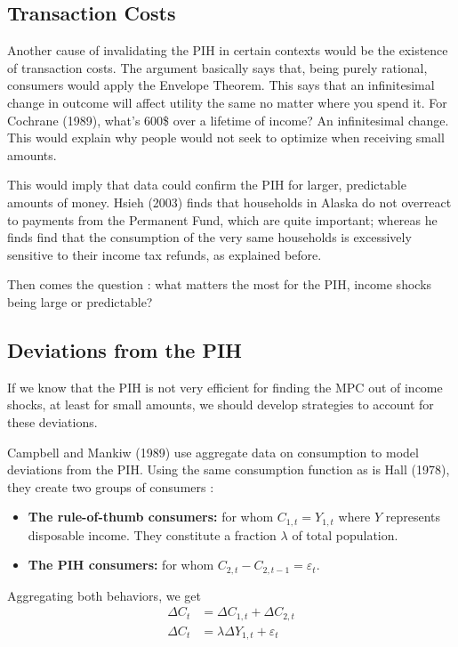 \documentclass[12pt]{report}
\begin{document}
\subsection{Transaction Costs}

Another cause of invalidating the PIH in certain contexts would be the existence of transaction costs. The argument basically says that, being purely rational, consumers would apply the Envelope Theorem. This says that an infinitesimal change in outcome will affect utility the same no matter where you spend it. For Cochrane (1989), what's 600\$ over a lifetime of income? An infinitesimal change. This would explain why people would not seek to optimize when receiving small amounts.

This would imply that data could confirm the PIH for larger, predictable amounts of money. Hsieh (2003) finds that  households  in  Alaska do not overreact to payments from the Permanent  Fund, which are quite important; whereas he finds  find  that  the  consumption of  the very  same  households  is  excessively  sensitive to their income tax refunds, as explained before.

Then comes the question : what matters the most for the PIH, income shocks being large or predictable?

\subsection{Deviations from the PIH}

If we know that the PIH is not very efficient for finding the MPC out of income shocks, at least for small amounts, we should develop strategies to account for these deviations.

Campbell and Mankiw (1989) use aggregate data on consumption to model deviations from the PIH. Using the same consumption function as is Hall (1978), they create two groups of consumers :\begin{itemize}
\item \textbf{The rule-of-thumb consumers:} for whom $C_{1,t} = Y_{1,t}$ where $Y$ represents disposable income. They constitute a fraction $\lambda$ of total population.
\item \textbf{The PIH consumers:} for whom $C_{2,t}-C_{2,t-1} = \varepsilon_t$.
\end{itemize}

Aggregating both behaviors, we get \begin{align*}
\Delta C_t & = \Delta C_{1,t} + \Delta C_{2,t}\\
\Delta C_t & = \lambda\Delta Y_{1,t} + \varepsilon_t
\end{align*}
\end{document}
